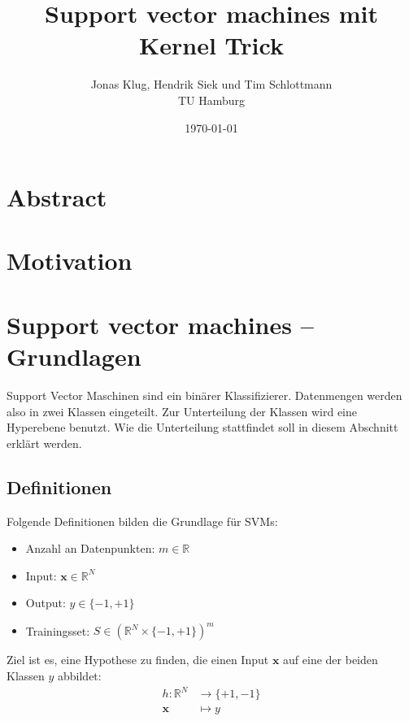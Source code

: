 \documentclass[10pt,a4paper]{scrartcl}
\title{Support vector machines mit Kernel Trick}
\author{Jonas Klug, Hendrik Siek und Tim Schlottmann \\ TU Hamburg }
\date{\today}
\begin{document}
    \maketitle

    \begin{multicols}{2}
        
    \section{Abstract}

    \section{Motivation}

    \section{Support vector machines -- Grundlagen}
    Support Vector Maschinen sind ein binärer Klassifizierer. Datenmengen werden also in zwei Klassen eingeteilt. Zur Unterteilung der Klassen wird eine Hyperebene benutzt. Wie die Unterteilung stattfindet soll in diesem Abschnitt erklärt werden.

        \subsection{Definitionen}
            Folgende Definitionen bilden die Grundlage für SVMs:

            \begin{itemize}
                \item Anzahl an Datenpunkten: $ m \in \mathbb{R} $
                \item Input: $ \boldsymbol{x} \in \mathbb{R}^N $
                \item Output: $ y \in \{ -1, +1 \} $
                \item Trainingsset: $S \in (\mathbb{R}^N \times \{ -1, +1 \})^m $
            \end{itemize}

            Ziel ist es, eine Hypothese zu finden, die einen Input $\boldsymbol{x}$ auf eine der beiden Klassen $y$ abbildet: \begin{align*}
                h: \mathbb{R}^N &\to \{ +1, -1 \} \\
                \boldsymbol{x} &\mapsto y \\
            \end{align*}

\end{multicols}
\end{document}
